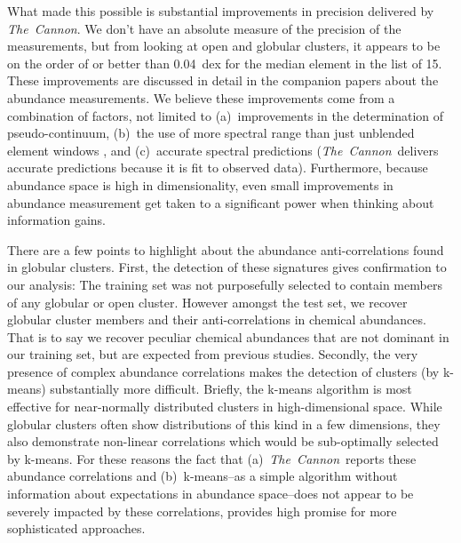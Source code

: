 \documentclass[12pt, letterpaper, preprint]{aastex}
\newcommand{\project}[1]{\textsl{#1}}
\newcommand{\thecannon}{\project{The~Cannon}}
\begin{document}
What made this possible is substantial improvements in precision
delivered by \thecannon.
We don't have an absolute measure of the precision of the measurements,
but from looking at open and globular clusters, it appears to be on the
order of or better than 0.04~dex for the median element in the list of 15.
These improvements are discussed in detail in the companion papers
\citep{casey16, ness16} about the abundance measurements.
We believe these improvements come from a combination of factors, not
limited to (a)~improvements in the determination of pseudo-continuum,
(b)~the use of more spectral range than just unblended element windows
\citep{aspcap}, and (c)~accurate spectral predictions
(\thecannon\ delivers accurate predictions because it is fit to
observed data). 
Furthermore, because abundance space is high in dimensionality, even
small improvements in abundance measurement get taken to a significant
power when thinking about information gains.


There are a few points to highlight about the abundance anti-correlations
found in globular clusters. First, the detection of these signatures gives
confirmation to our analysis: The training set was not purposefully selected
to contain members of any globular or open cluster. However amongst the test
set, we recover globular cluster members and their anti-correlations 
in chemical abundances. That is to
say we recover peculiar chemical abundances that are not dominant in our
training set, but are expected from previous studies. Secondly, the very
presence of complex abundance correlations makes the detection of clusters
(by k-means) substantially more difficult. Briefly, the k-means algorithm
is most effective for near-normally distributed clusters in high-dimensional space.
While globular clusters often show distributions of this kind in a few dimensions, they also demonstrate non-linear correlations which would be
sub-optimally selected by k-means. For these reasons the fact that (a)~\thecannon\
reports these abundance correlations and (b)~k-means--as a simple algorithm without information about expectations in abundance space--does not appear to be
severely impacted by these correlations, provides high promise for more sophisticated approaches.
\end{document}
